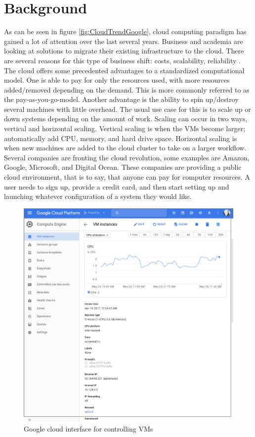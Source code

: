 \documentclass[12pt]{article}
\begin{document}
\section{Background}
As can be seen in figure \ref{fig:CloudTrendGoogle}, cloud computing paradigm has gained a lot of attention over the last several years. Business and academia are looking at solutions to migrate their existing infrastructure to the cloud. There are several reasons for this type of business shift: costs, scalability, reliability \cite{DillonWuChang}. The cloud offers some precedented advantages to a standardized computational model. One is able to pay for only the resources used, with more resources added/removed depending on the demand. This is more commonly referred to as the pay-as-you-go-model. Another advantage is the ability to spin up/destroy several machines with little overhead. The usual use case for this is to scale up or down systems depending on the amount of work. Scaling can occur in two ways, vertical and horizontal scaling. Vertical scaling is when the VMs become larger; automatically add CPU, memory, and hard drive space. Horizontal scaling is when new machines are added to the cloud cluster to take on a larger workflow. Several companies are fronting the cloud revolution, some examples are Amazon\cite{amazonaws2017}, Google\cite{GoogleCloudCompute2017}, Microsoft\cite{Azure2017}, and Digital Ocean\cite{DigitalOcian2017}. These companies are providing a public cloud environment, that is to say, that anyone can pay for computer resources. A user needs to sign up, provide a credit card, and then start setting up and launching whatever configuration of a system they would like.
\begin{figure}[ht]
    \centering
    \includegraphics[scale=.2]{./pic/2017-05-24-114324_946x962_scrot.png}
    \caption{Google cloud interface for controlling VMs}
    \label{fig:GoogleInterface}
\end{figure}
\end{document}

